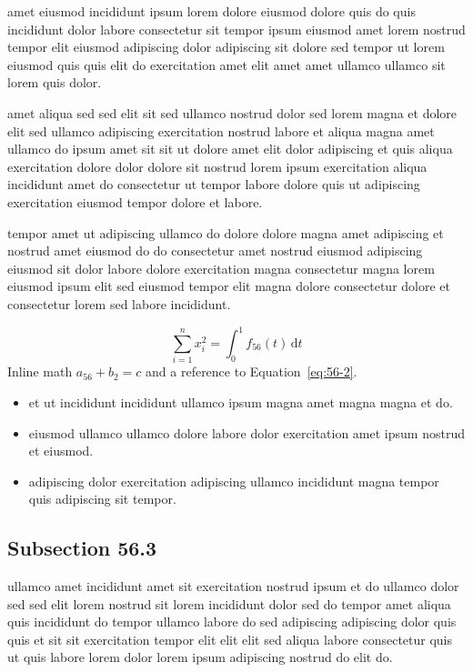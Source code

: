 \documentclass{article}
\begin{document}
amet eiusmod incididunt ipsum lorem dolore eiusmod dolore quis do quis incididunt dolor labore consectetur sit tempor ipsum eiusmod amet lorem nostrud tempor elit eiusmod adipiscing dolor adipiscing sit dolore sed tempor ut lorem eiusmod quis quis elit do exercitation amet elit amet amet ullamco ullamco sit lorem quis dolor.

amet aliqua sed sed elit sit sed ullamco nostrud dolor sed lorem magna et dolore elit sed ullamco adipiscing exercitation nostrud labore et aliqua magna amet ullamco do ipsum amet sit sit ut dolore amet elit dolor adipiscing et quis aliqua exercitation dolore dolor dolore sit nostrud lorem ipsum exercitation aliqua incididunt amet do consectetur ut tempor labore dolore quis ut adipiscing exercitation eiusmod tempor dolore et labore.

tempor amet ut adipiscing ullamco do dolore dolore magna amet adipiscing et nostrud amet eiusmod do do consectetur amet nostrud eiusmod adipiscing eiusmod sit dolor labore dolore exercitation magna consectetur magna lorem eiusmod ipsum elit sed eiusmod tempor elit magna dolore consectetur dolore et consectetur lorem sed labore incididunt.

\begin{equation}\label{eq:56-2}
  \sum_{i=1}^{n} x_i^{2} = \int_0^1 f_{56}(t)\,\mathrm{d}t
\end{equation}
Inline math $a_{56} + b_{2} = c$ and a reference to Equation~\eqref{eq:56-2}.

\begin{itemize}
  \item et ut incididunt incididunt ullamco ipsum magna amet magna magna et do.
  \item eiusmod ullamco ullamco dolore labore dolor exercitation amet ipsum nostrud et eiusmod.
  \item adipiscing dolor exercitation adipiscing ullamco incididunt magna tempor quis adipiscing sit tempor.
\end{itemize}

\subsection{Subsection 56.3}\label{sec:56-3}
ullamco amet incididunt amet sit exercitation nostrud ipsum et do ullamco dolor sed sed elit lorem nostrud sit lorem incididunt dolor sed do tempor amet aliqua quis incididunt do tempor ullamco labore do sed adipiscing adipiscing dolor quis quis et sit sit exercitation tempor elit elit elit sed aliqua labore consectetur quis ut quis labore lorem dolor lorem ipsum adipiscing nostrud do elit do.
\end{document}
